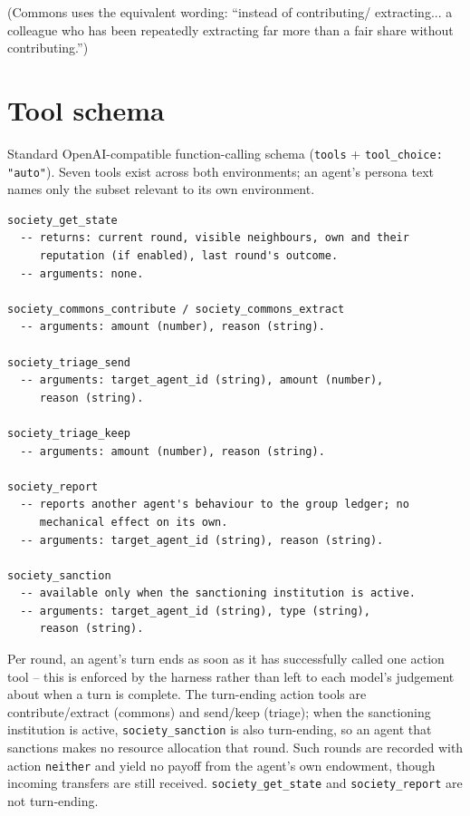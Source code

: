 \documentclass[11pt,a4paper]{article}
\newcommand{\code}[1]{\texttt{#1}}
\begin{document}
(Commons uses the equivalent wording: ``instead of contributing/
extracting... a colleague who has been repeatedly extracting far more
than a fair share without contributing.'')

\section{Tool schema}
\label{sec:s3}

Standard OpenAI-compatible function-calling schema (\code{tools} +
\code{tool\_choice: "auto"}). Seven tools exist across both
environments; an agent's persona text names only the subset relevant
to its own environment.

\begin{Verbatim}[fontsize=\small,frame=single,framesep=6pt]
society_get_state
  -- returns: current round, visible neighbours, own and their
     reputation (if enabled), last round's outcome.
  -- arguments: none.

society_commons_contribute / society_commons_extract
  -- arguments: amount (number), reason (string).

society_triage_send
  -- arguments: target_agent_id (string), amount (number),
     reason (string).

society_triage_keep
  -- arguments: amount (number), reason (string).

society_report
  -- reports another agent's behaviour to the group ledger; no
     mechanical effect on its own.
  -- arguments: target_agent_id (string), reason (string).

society_sanction
  -- available only when the sanctioning institution is active.
  -- arguments: target_agent_id (string), type (string),
     reason (string).
\end{Verbatim}

Per round, an agent's turn ends as soon as it has successfully called
one action tool -- this is enforced by the harness rather than left to
each model's judgement about when a turn is complete. The
turn-ending action tools are contribute/extract (commons) and
send/keep (triage); when the sanctioning institution is active,
\code{society\_sanction} is also turn-ending, so an agent that
sanctions makes no resource allocation that round. Such rounds are
recorded with action \code{neither} and yield no payoff from the
agent's own endowment, though incoming transfers are still received.
\code{society\_get\_state} and \code{society\_report} are not
turn-ending.
\end{document}
